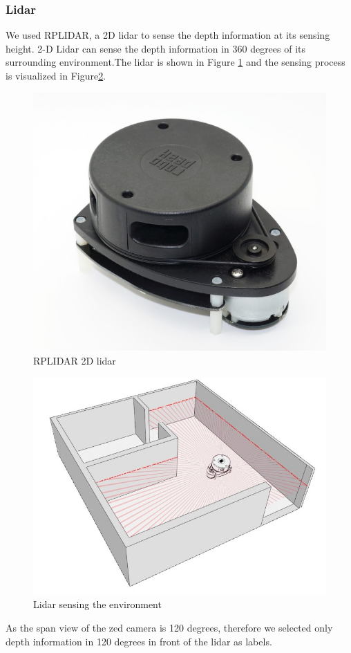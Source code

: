 \documentclass[10pt,twocolumn,letterpaper]{article}
\begin{document}
\subsubsection{Lidar}
We used RPLIDAR, a 2D lidar to sense the depth information at its sensing height. 2-D Lidar can sense the depth information in 360 degrees of its surrounding environment.The lidar is shown in Figure \ref{lidar} and the sensing process is visualized in Figure\ref{lidar_sensing}.

\begin{figure}
	\centering
		\includegraphics[width=.3\linewidth]{pictures/lidar.jpg}
		\caption{RPLIDAR 2D lidar}
		\label{lidar}

\end{figure}
\begin{figure}
		\centering
		\includegraphics[width=.8\linewidth]{pictures/lidar_sensing.jpg}
		\caption{Lidar sensing the environment}
		\label{lidar_sensing}
\end{figure}

As the span view of the zed camera is 120 degrees, therefore we selected only depth information in 120 degrees in front of the lidar as labels. 
\end{document}
